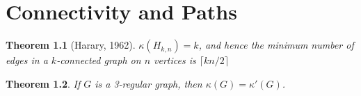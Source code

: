 \documentclass{book} %
\newtheorem{theorem}{Theorem}
\begin{document}
\chapter{Connectivity and Paths}

\begin{theorem}[Harary, 1962]
\(\kappa(H_{k,n}) = k \), and hence the minimum number of edges in a \(k\)-connected graph on \(n\) vertices is \(\lceil kn / 2 \rceil\)
\end{theorem}

\begin{theorem}
If \(G\) is a 3-regular graph, then \(\kappa(G) = \kappa'(G)\).
\end{theorem}
\end{document}
